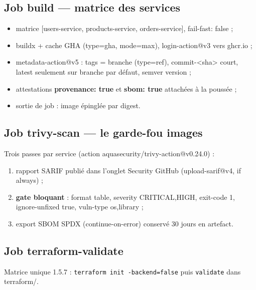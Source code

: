 \documentclass[12pt,a4paper]{article}
\begin{document}
\subsection{Job build --- matrice des services}
\begin{itemize}[itemsep=1pt]
  \item matrice [users-service, products-service, orders-service], fail-fast: false ;
  \item buildx + cache GHA (type=gha, mode=max), login-action@v3 vers ghcr.io ;
  \item metadata-action@v5 : tags = branche (type=ref), commit-<sha> court, latest seulement sur branche par défaut, semver {{version}} ;
  \item attestations \textbf{provenance: true} et \textbf{sbom: true} attachées à la poussée ;
  \item sortie de job : image épinglée par digest.
\end{itemize}

\subsection{Job trivy-scan --- le garde-fou images}
Trois passes par service (action aquasecurity/trivy-action@v0.24.0) :
\begin{enumerate}[itemsep=1pt]
  \item rapport SARIF publié dans l'onglet Security GitHub (upload-sarif@v4, if always) ;
  \item \textbf{gate bloquant} : format table, severity CRITICAL,HIGH, exit-code 1, ignore-unfixed true, vuln-type os,library ;
  \item export SBOM SPDX (continue-on-error) conservé 30 jours en artefact.
\end{enumerate}

\subsection{Job terraform-validate}
Matrice unique 1.5.7 : \texttt{terraform init -backend=false} puis \texttt{validate} dans terraform/.
\end{document}
